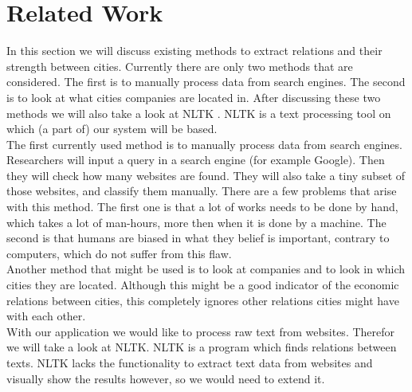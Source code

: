 \section{Related Work}
In this section we will discuss existing methods to extract relations and their strength between cities. Currently there are only two methods that are considered. The first is to manually process data from search engines. The second is to look at what cities companies are located in. After discussing these two methods we will also take a look at NLTK \cite{nlkt_stemming}. NLTK is  a text processing tool on which (a part of) our system will be based.\\

The first currently used method is to manually process data from search engines. Researchers will input a query in a search engine (for example Google). Then they will check how many websites are found. They will also take a tiny subset of those websites, and classify them manually. There are a few problems that arise with this method. The first one is that a lot of works needs to be done by hand, which takes a lot of man-hours, more then when it is done by a machine. The second is that humans are biased in what they belief is important, contrary to computers, which do not suffer from this flaw. \\

Another method that might be used is to look at companies and to look in which cities they are located. Although this might be a good indicator of the economic relations between cities, this completely ignores other relations cities might have with each other.\\

With our application we would like to process raw text from websites. Therefor we will take a look at NLTK. NLTK is a program which finds relations between texts. NLTK lacks the functionality to extract text data from websites and visually show the results however, so we would need to extend it. 
